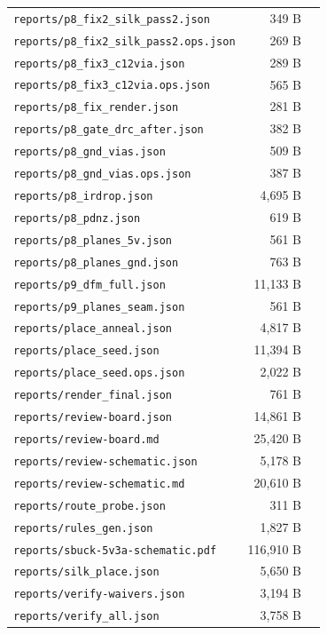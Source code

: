\documentclass[11pt,a4paper]{article}
\begin{document}
{\begin{longtable}{p{9cm}rp{4cm}}
\texttt{reports/p8\_fix2\_silk\_pass2.json} & 349 B &  \\
\texttt{reports/p8\_fix2\_silk\_pass2.ops.json} & 269 B &  \\
\texttt{reports/p8\_fix3\_c12via.json} & 289 B &  \\
\texttt{reports/p8\_fix3\_c12via.ops.json} & 565 B &  \\
\texttt{reports/p8\_fix\_render.json} & 281 B &  \\
\texttt{reports/p8\_gate\_drc\_after.json} & 382 B &  \\
\texttt{reports/p8\_gnd\_vias.json} & 509 B &  \\
\texttt{reports/p8\_gnd\_vias.ops.json} & 387 B &  \\
\texttt{reports/p8\_irdrop.json} & 4,695 B &  \\
\texttt{reports/p8\_pdnz.json} & 619 B &  \\
\texttt{reports/p8\_planes\_5v.json} & 561 B &  \\
\texttt{reports/p8\_planes\_gnd.json} & 763 B &  \\
\texttt{reports/p9\_dfm\_full.json} & 11,133 B &  \\
\texttt{reports/p9\_planes\_seam.json} & 561 B &  \\
\texttt{reports/place\_anneal.json} & 4,817 B &  \\
\texttt{reports/place\_seed.json} & 11,394 B &  \\
\texttt{reports/place\_seed.ops.json} & 2,022 B &  \\
\texttt{reports/render\_final.json} & 761 B &  \\
\texttt{reports/review-board.json} & 14,861 B &  \\
\texttt{reports/review-board.md} & 25,420 B &  \\
\texttt{reports/review-schematic.json} & 5,178 B &  \\
\texttt{reports/review-schematic.md} & 20,610 B &  \\
\texttt{reports/route\_probe.json} & 311 B &  \\
\texttt{reports/rules\_gen.json} & 1,827 B &  \\
\texttt{reports/sbuck-5v3a-schematic.pdf} & 116,910 B &  \\
\texttt{reports/silk\_place.json} & 5,650 B &  \\
\texttt{reports/verify-waivers.json} & 3,194 B &  \\
\texttt{reports/verify\_all.json} & 3,758 B &  \\
\bottomrule
\end{longtable}
}
\end{document}
